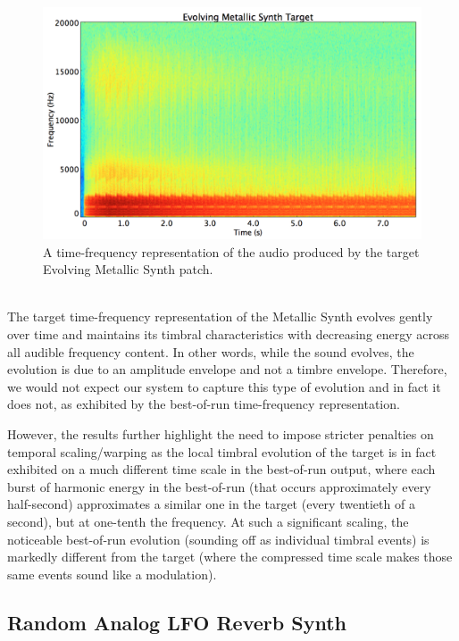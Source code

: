 \documentclass[12pt]{report} 	%
\numberwithin{figure}{chapter}
\numberwithin{table}{chapter}
\numberwithin{equation}{chapter}
\begin{document}
\begin{flushleft}
\begin{figure}[h!]
\begin{center}
\includegraphics[scale=0.35,width=\linewidth]{EvolvingMetallicSynthTargetSTFT}
\caption[Target evolving metallic synth time-frequency representation]{A time-frequency representation of the audio produced by the target Evolving Metallic Synth patch.}
\end{center}
\end{figure}
\\
\clearpage
The target time-frequency representation of the Metallic Synth evolves gently over time and maintains its timbral characteristics with decreasing energy across all audible frequency content. In other words, while the sound evolves, the evolution is due to an amplitude envelope and not a timbre envelope. Therefore, we would not expect our system to capture this type of evolution and in fact it does not, as exhibited by the best-of-run time-frequency representation.

However, the results further highlight the need to impose stricter penalties on temporal scaling/warping as the local timbral evolution of the target is in fact exhibited on a much different time scale in the best-of-run output, where each burst of harmonic energy in the best-of-run (that occurs approximately every half-second) approximates a similar one in the target (every twentieth of a second), but at one-tenth the frequency. At such a significant scaling, the noticeable best-of-run evolution (sounding off as individual timbral events) is markedly different from the target (where the compressed time scale makes those same events sound like a modulation).

\subsection{Random Analog LFO Reverb Synth}


\end{flushleft}
\end{document}
